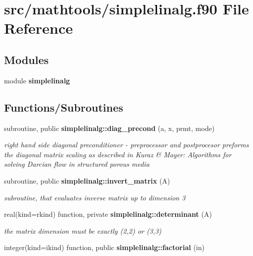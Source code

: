\section{src/mathtools/simplelinalg.f90 File Reference}
\label{simplelinalg_8f90}
\subsection*{Modules}
\begin{DoxyCompactItemize}
\item 
module {\bf simplelinalg}
\end{DoxyCompactItemize}
\subsection*{Functions/\+Subroutines}
\begin{DoxyCompactItemize}
\item 
subroutine, public {\bf simplelinalg\+::diag\+\_\+precond} (a, x, prmt, mode)
\begin{DoxyCompactList}\small\item\em right hand side diagonal preconditioner -\/ preprocessor and postprocesor preforms the diagonal matrix scaling as described in Kuraz \& Mayer\+: Algorithms for solving Darcian flow in structured porous media \end{DoxyCompactList}\item 
subroutine, public {\bf simplelinalg\+::invert\+\_\+matrix} (A)
\begin{DoxyCompactList}\small\item\em subroutine, that evaluates inverse matrix up to dimension 3 \end{DoxyCompactList}\item 
real(kind=rkind) function, private {\bf simplelinalg\+::determinant} (A)
\begin{DoxyCompactList}\small\item\em the matrix dimension must be exactly (2,2) or (3,3) \end{DoxyCompactList}\item 
integer(kind=ikind) function, public {\bf simplelinalg\+::factorial} (in)
\end{DoxyCompactItemize}

